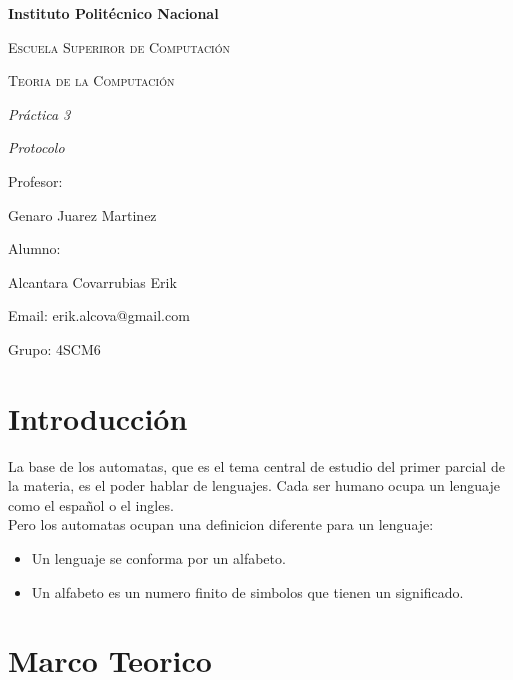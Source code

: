\documentclass{article}
\begin{document}
\begin{titlepage}
\centering

{\bfseries\LARGE Instituto Polit\'ecnico Nacional \par}
\vspace{1cm}
{\scshape\Large Escuela Superiror de Computaci\'on \par}
\vspace{3cm}
{\scshape\Large Teoria de la Computaci\'on \par}
\vspace{3cm}
{\itshape\Large Pr\'actica 3 \par}
{\itshape\Large Protocolo \par}
\vfill
{\Large Profesor: \par}
{\Large Genaro Juarez Martinez \par}
{\Large Alumno: \par}
{\Large Alcantara Covarrubias Erik \par}
{\Large Email: erik.alcova@gmail.com \par}
{\Large Grupo: 4SCM6\par}
\vfill
\end{titlepage}

\tableofcontents

\newpage

\section{Introducción}
La base de los automatas, que es el tema central de estudio del primer parcial de la materia, es el poder hablar de lenguajes. Cada ser humano ocupa un lenguaje como el español o el ingles. 
\\Pero los automatas ocupan una definicion diferente para un lenguaje:
\begin{itemize}
    \item Un lenguaje se conforma por un alfabeto.
    \item Un alfabeto es un numero finito de simbolos que tienen un significado.
\end{itemize}

\section{Marco Teorico}
\end{document}
